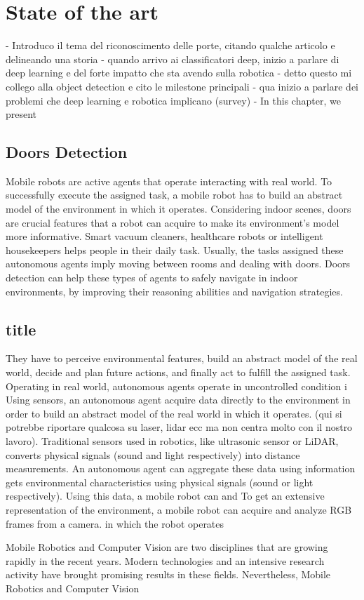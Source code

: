 \chapter{State of the art}
\label{capitolo2}
\thispagestyle{empty}

 - Introduco il tema del riconoscimento delle porte, citando qualche articolo e delineando una storia 
 - quando arrivo ai classificatori deep, inizio a parlare di deep learning e del forte impatto che sta avendo sulla robotica
 - detto questo mi collego alla object detection e cito le milestone principali 
 - qua inizio a parlare dei problemi che deep learning e robotica implicano (survey)
 - 
 \newline
 In this chapter, we present  
 
 
 \section{Doors Detection}
 Mobile robots are active agents that operate interacting with real world. To successfully execute the assigned task, a mobile robot has to build an abstract model of the environment in which it operates. Considering indoor scenes, doors are crucial features that a robot can acquire to make its environment's model more informative. 
 Smart vacuum cleaners, healthcare robots or intelligent housekeepers helps people in their daily task. Usually, the tasks assigned these autonomous agents imply moving between rooms and dealing with doors.
 Doors detection can help these types of agents to safely navigate in indoor environments, by improving their reasoning abilities and navigation strategies. 
 
 
 \section{title}
    They have to perceive environmental features, build an abstract model of the real world, decide and plan future actions, and finally act to fulfill the assigned task. Operating in real world, autonomous agents operate in uncontrolled condition i Using sensors, an autonomous agent acquire data directly to the environment in order to build an abstract model of the real world in which it operates. (qui si potrebbe riportare qualcosa su laser, lidar ecc ma non centra molto con il nostro lavoro). Traditional sensors used in robotics, like ultrasonic sensor or LiDAR, converts physical signals (sound and light respectively) into distance measurements. An autonomous agent can aggregate these data using    information gets environmental characteristics using physical signals (sound or light respectively). Using this data, a mobile robot can and  To get an extensive representation of the environment, a mobile robot can acquire and analyze RGB frames from a camera.  in which  the robot operates 
 
 Mobile Robotics and Computer Vision are two disciplines that are growing rapidly in the recent years. Modern technologies and an intensive research activity have brought promising results in these fields.
 Nevertheless, Mobile Robotics and Computer Vision   

